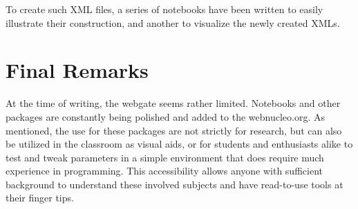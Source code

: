 \documentclass{article}
\begin{document}
To create such XML files, a series of notebooks have been written to easily illustrate their construction, and another to visualize 
the newly created XMLs.

\section*{Final Remarks}

At the time of writing, the webgate seems rather limited. Notebooks and other packages are constantly being polished and added to the 
webnucleo.org. As mentioned, the use for these packages are not strictly for research, but can also be utilized in the classroom as 
visual aids, or for students and enthusiasts alike to test and tweak parameters in a simple environment that does require much 
experience in programming. This accessibility allows anyone with sufficient background to understand these involved subjects and have 
read-to-use tools at their finger tips. 
\end{document}

